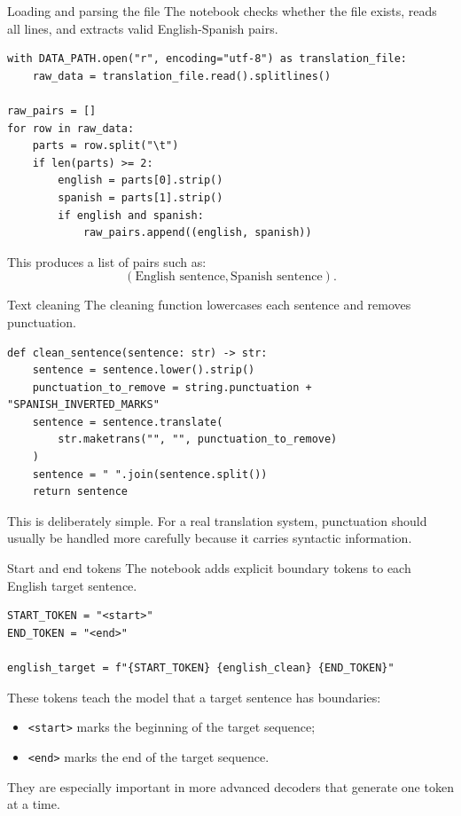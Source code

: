 \documentclass[aspectratio=169]{beamer}
\begin{document}
%
%
\begin{frame}[fragile]{Loading and parsing the file}
The notebook checks whether the file exists, reads all lines, and extracts valid English-Spanish pairs.

\begin{lstlisting}
with DATA_PATH.open("r", encoding="utf-8") as translation_file:
    raw_data = translation_file.read().splitlines()

raw_pairs = []
for row in raw_data:
    parts = row.split("\t")
    if len(parts) >= 2:
        english = parts[0].strip()
        spanish = parts[1].strip()
        if english and spanish:
            raw_pairs.append((english, spanish))
\end{lstlisting}

This produces a list of pairs such as:
\[
    (\text{English sentence}, \text{Spanish sentence}).
\]
\end{frame}
%
%
\begin{frame}[fragile]{Text cleaning}
The cleaning function lowercases each sentence and removes punctuation.

\begin{lstlisting}
def clean_sentence(sentence: str) -> str:
    sentence = sentence.lower().strip()
    punctuation_to_remove = string.punctuation + "SPANISH_INVERTED_MARKS"
    sentence = sentence.translate(
        str.maketrans("", "", punctuation_to_remove)
    )
    sentence = " ".join(sentence.split())
    return sentence
\end{lstlisting}

\vspace{0.2cm}
This is deliberately simple. For a real translation system, punctuation should usually be handled more carefully because it carries syntactic information.
\end{frame}
%
%
\begin{frame}[fragile]{Start and end tokens}
The notebook adds explicit boundary tokens to each English target sentence.

\begin{lstlisting}
START_TOKEN = "<start>"
END_TOKEN = "<end>"

english_target = f"{START_TOKEN} {english_clean} {END_TOKEN}"
\end{lstlisting}

\vspace{0.2cm}
These tokens teach the model that a target sentence has boundaries:
\begin{itemize}
    \item \texttt{<start>} marks the beginning of the target sequence;
    \item \texttt{<end>} marks the end of the target sequence.
\end{itemize}

They are especially important in more advanced decoders that generate one token at a time.
\end{frame}
\end{document}
